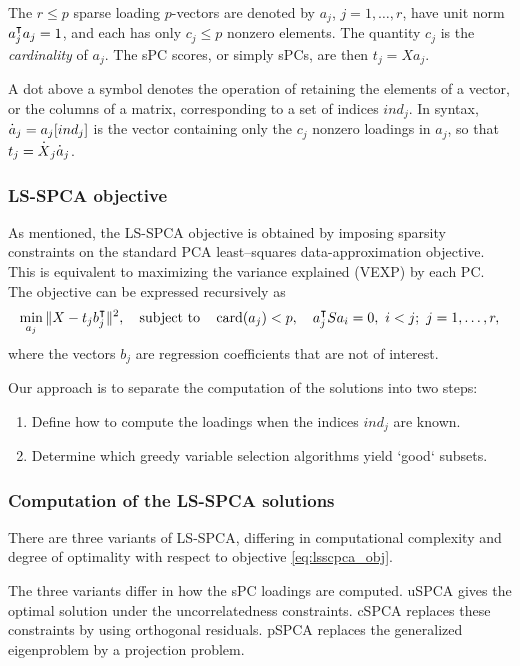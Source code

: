 \documentclass[article]{jss}
\begin{document}
The $r \leq p$ sparse loading $p$-vectors are denoted by $a_j$, $j = 1,\ldots,r$, have unit norm $a^{\scriptstyle{\intercal}}_j a_j = 1$, and each has only $c_j \leq p$ nonzero elements. The quantity $c_j$ is the \emph{cardinality} of $a_j$. The sPC scores, or simply sPCs, are then $t_j = Xa_j$.

A dot above a symbol denotes the operation of retaining the elements of a vector, or the columns of a matrix, corresponding to a set of indices $ind_j$. In  syntax, ${\overset{\boldsymbol{.}}{a}_j} = a_j[ind_j]$ is the vector containing only the $c_j$ nonzero loadings in $a_j$, so that $t_j = {\overset{\boldsymbol{.}}{X}_j}{\overset{\boldsymbol{.}}{a}}_j$.

\subsubsection{LS-SPCA objective}
As mentioned, the LS-SPCA objective is obtained by imposing sparsity constraints on the standard PCA least--squares data-approximation objective. This is equivalent to maximizing the variance explained (VEXP) by each PC. The objective can be expressed recursively as
\begin{equation}\label{eq:lsscpca_obj}
\min_{a_j} \|X - t_j b_j^{\scriptstyle{\intercal}}\|^2,
\quad \text{subject to}\quad
\operatorname{card}(a_j) < p,
\quad a^{\scriptstyle{\intercal}}_j S a_i = 0,\ i < j;\ j = 1, \ldots, r,
\end{equation}
where the vectors $b_j$ are regression coefficients that are not of interest.

Our approach is to separate the computation of the solutions into two steps:
\begin{enumerate}
\item Define how to compute the loadings when the indices $ind_j$ are known.
\item Determine which greedy variable selection algorithms yield `good` subsets.
\end{enumerate}
\subsubsection{Computation of the LS-SPCA solutions}
There are three variants of LS-SPCA, differing in computational complexity and degree of optimality with respect to objective \ref{eq:lsscpca_obj}.

The three variants differ in how the sPC loadings are computed. uSPCA gives the optimal solution under the uncorrelatedness constraints.
cSPCA replaces these constraints by using orthogonal residuals. pSPCA replaces the generalized eigenproblem by a projection problem.
\end{document}
